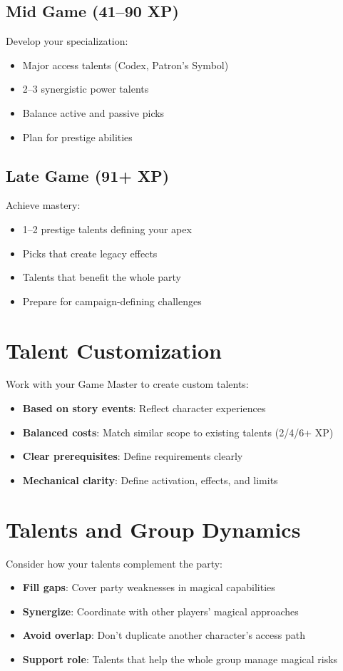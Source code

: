 \subsection*{Mid Game (41--90 XP)}
Develop your specialization:
\begin{itemize}
\item Major access talents (Codex, Patron's Symbol)
\item 2--3 synergistic power talents
\item Balance active and passive picks
\item Plan for prestige abilities
\end{itemize}

\subsection*{Late Game (91+ XP)}
Achieve mastery:
\begin{itemize}
\item 1--2 prestige talents defining your apex
\item Picks that create legacy effects
\item Talents that benefit the whole party
\item Prepare for campaign-defining challenges
\end{itemize}

\section{Talent Customization}

Work with your Game Master to create custom talents:
\begin{itemize}
\item \textbf{Based on story events}: Reflect character experiences
\item \textbf{Balanced costs}: Match similar scope to existing talents (2/4/6+ XP)
\item \textbf{Clear prerequisites}: Define requirements clearly
\item \textbf{Mechanical clarity}: Define activation, effects, and limits
\end{itemize}

\section{Talents and Group Dynamics}

Consider how your talents complement the party:
\begin{itemize}
\item \textbf{Fill gaps}: Cover party weaknesses in magical capabilities
\item \textbf{Synergize}: Coordinate with other players' magical approaches
\item \textbf{Avoid overlap}: Don't duplicate another character's access path
\item \textbf{Support role}: Talents that help the whole group manage magical risks
\end{itemize}

